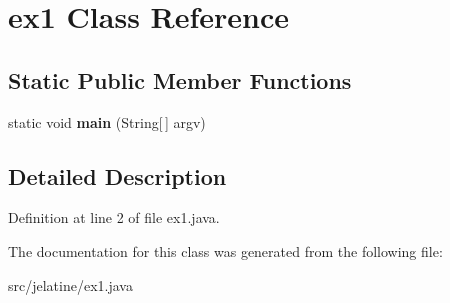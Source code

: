 \section{ex1 Class Reference}
\label{classex1}
\subsection*{Static Public Member Functions}
\begin{DoxyCompactItemize}
\item 
static void {\bfseries main} (String[$\,$] argv)\label{classex1_af175fde2d41f8bf6fb56ea31cd0303eb}

\end{DoxyCompactItemize}


\subsection{Detailed Description}


Definition at line 2 of file ex1.java.



The documentation for this class was generated from the following file:\begin{DoxyCompactItemize}
\item 
src/jelatine/ex1.java\end{DoxyCompactItemize}
